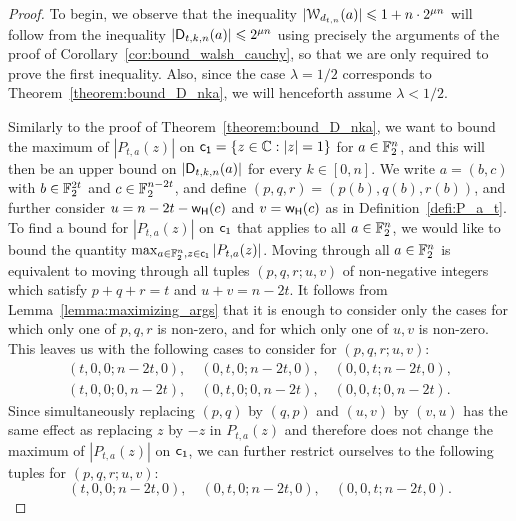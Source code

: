 \documentclass{llncs}
\begin{document}
\begin{proof}
    To begin, we observe that the inequality $|\mathcal W_{d_{t,n}}(a)|\leqslant 1+n\cdot 2^{\mu n}$ will follow from the inequality $|\mathsf{D}_{t,k,n}(a)|\leqslant 2^{\mu n}$ using precisely the arguments of the proof of Corollary~\ref{cor:bound_walsh_cauchy}, so that we are only required to prove the first inequality. Also, since the case $\lambda=1/2$ corresponds to Theorem~\ref{theorem:bound_D_nka}, we will henceforth assume $\lambda<1/2$.
    
    Similarly to the proof of Theorem~\ref{theorem:bound_D_nka}, we want to bound the maximum of $|P_{t,a}(z)|$ on $\mathsf{c_1}=\{ z \in \mathbb{C}: |z|=1  \}$ for $a\in\mathbb{F}_2^n$, and this will then be an upper bound on $|\mathsf{D}_{t,k,n}(a)|$ for every $k\in[0,n]$. 
    We write $a=(b,c)$ with $b\in\mathbb{F}_2^{2t}$ and $c\in\mathbb{F}_2^{n-2t}$, and define $(p,q,r)=(p(b),q(b),r(b))$, and further consider $u=n-2t-\mathsf{w_H}(c)$ and $v=\mathsf{w_H}(c)$ as in Definition~\ref{defi:P_a_t}.    
	To find a bound for $|P_{t,a}(z)|$ on $\mathsf{c_1}$ that applies to all $a\in\mathbb{F}_2^n$, we would like to bound the quantity $\max_{a\in\mathbb{F}_2^n,z\in\mathsf{c_1}}|P_{t,a}(z)|$. Moving through all $a\in\mathbb{F}_2^n$ is equivalent to moving through all tuples $(p,q,r;u,v)$ of non-negative integers which satisfy $p+q+r=t$ and $u+v=n-2t$. It follows from Lemma~\ref{lemma:maximizing_args} that it is enough to consider only the cases for which only one of $p,q,r$ is non-zero, and for which only one of $u,v$ is non-zero. 
	This leaves us with the following cases to consider for $(p,q,r;u,v)$:
    \begin{gather*}
        (t,0,0;n-2t,0),\quad(0,t,0;n-2t,0),\quad(0,0,t;n-2t,0),\\
        (t,0,0;0,n-2t),\quad(0,t,0;0,n-2t),\quad(0,0,t;0,n-2t).
    \end{gather*}
    Since simultaneously replacing $(p,q)$ by $(q,p)$ and $(u,v)$ by $(v,u)$ has the same effect as replacing $z$ by $-z$ in $P_{t,a}(z)$ and therefore does not change the maximum of $|P_{t,a}(z)|$ on $\mathsf{c_1}$, we can further restrict ourselves to the following tuples for $(p,q,r;u,v)$:
    \[
        (t,0,0;n-2t,0),\quad(0,t,0;n-2t,0),\quad(0,0,t;n-2t,0).
    \]


\end{proof}
\end{document}
